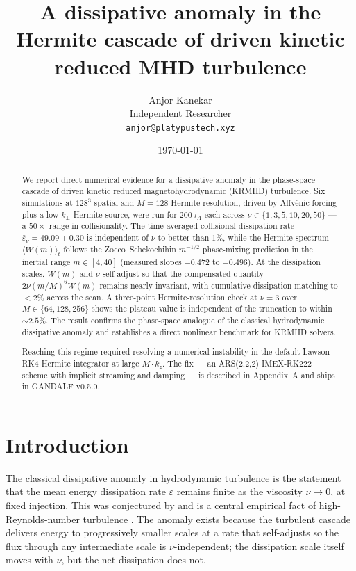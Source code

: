 \documentclass[11pt]{article}
\title{A dissipative anomaly in the Hermite cascade of driven kinetic reduced MHD turbulence}
\author{Anjor Kanekar\\
\small Independent Researcher\\
\small \texttt{anjor@platypustech.xyz}}
\date{\today}
\newcommand{\epsnu}{\varepsilon_\nu}
\newcommand{\taua}{\tau_A}
\newcommand{\kperp}{k_\perp}
\begin{document}
\maketitle

\begin{abstract}
We report direct numerical evidence for a dissipative anomaly in the phase-space cascade of driven kinetic reduced magnetohydrodynamic (KRMHD) turbulence. Six simulations at $128^3$ spatial and $M=128$ Hermite resolution, driven by Alfv\'enic forcing plus a low-$\kperp$ Hermite source, were run for $200\,\taua$ each across $\nu \in \{1, 3, 5, 10, 20, 50\}$ --- a $50\times$ range in collisionality. The time-averaged collisional dissipation rate $\bar\epsnu = 49.09 \pm 0.30$ is independent of $\nu$ to better than $1\%$, while the Hermite spectrum $\langle W(m)\rangle_t$ follows the Zocco--Schekochihin $m^{-1/2}$ phase-mixing prediction in the inertial range $m \in [4, 40]$ (measured slopes $-0.472$ to $-0.496$). At the dissipation scales, $W(m)$ and $\nu$ self-adjust so that the compensated quantity $2\nu(m/M)^6 W(m)$ remains nearly invariant, with cumulative dissipation matching to $< 2\%$ across the scan. A three-point Hermite-resolution check at $\nu = 3$ over $M \in \{64, 128, 256\}$ shows the plateau value is independent of the truncation to within $\sim 2.5\%$. The result confirms the phase-space analogue of the classical hydrodynamic dissipative anomaly and establishes a direct nonlinear benchmark for KRMHD solvers.

Reaching this regime required resolving a numerical instability in the default Lawson-RK4 Hermite integrator at large $M \cdot k_z$. The fix --- an ARS(2,2,2) IMEX-RK222 scheme with implicit streaming and damping --- is described in Appendix~A and ships in GANDALF v0.5.0.
\end{abstract}

\section{Introduction}

The classical dissipative anomaly in hydrodynamic turbulence is the statement that the mean energy dissipation rate $\varepsilon$ remains finite as the viscosity $\nu \to 0$, at fixed injection. This was conjectured by \citet{onsager1949} and is a central empirical fact of high-Reynolds-number turbulence \citep{duchon2000}. The anomaly exists because the turbulent cascade delivers energy to progressively smaller scales at a rate that self-adjusts so the flux through any intermediate scale is $\nu$-independent; the dissipation scale itself moves with $\nu$, but the net dissipation does not.
\end{document}
